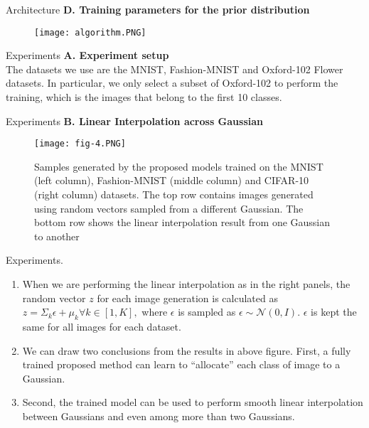 \documentclass{beamer}
\begin{document}
\begin{frame}{Architecture}
\textbf{D. Training parameters for the prior distribution\\}
\begin{figure}[!tbp]
  \centering
  {\texttt{[image: algorithm.PNG]}}
  \hfill
\end{figure}
\end{frame}



\begin{frame}{Experiments}
\textbf{A. Experiment setup\\}
The datasets we use are the MNIST, Fashion-MNIST and Oxford-102 Flower datasets. In particular, we only select a subset of Oxford-102 to perform the training, which is the images that belong to the first 10 classes. 
\end{frame}


\begin{frame}{Experiments}
\textbf{B. Linear Interpolation across Gaussian\\}
\begin{figure}[!tbp]
  \centering
  {\texttt{[image: fig-4.PNG]}}
  \hfill
  
  \caption{Samples generated by the proposed models trained on the MNIST (left column), Fashion-MNIST (middle column) and CIFAR-10 (right column) datasets. The top row contains images generated using random vectors sampled from a different Gaussian. The bottom row shows the linear interpolation result from one Gaussian to another }
\end{figure}
\end{frame}



\begin{frame}{Experiments}.
\begin{enumerate}[]
\item  When we are performing the linear interpolation as in the right panels, the random vector $z$ for each image generation is calculated as $z = \Sigma_k\epsilon + \mu_k \forall k \in [1, K],$ where $\epsilon$ is sampled as $\epsilon \sim \mathcal{N}(0, I)$. $\epsilon$ is kept the same for all images for each dataset.
\item We can draw two conclusions from the results in above figure. First, a fully trained proposed method can learn to ``allocate” each class of image to a Gaussian.
\item Second, the trained model can be used to perform smooth linear interpolation between Gaussians and even among more than two Gaussians.
\end{enumerate}
\end{frame}
\end{document}
